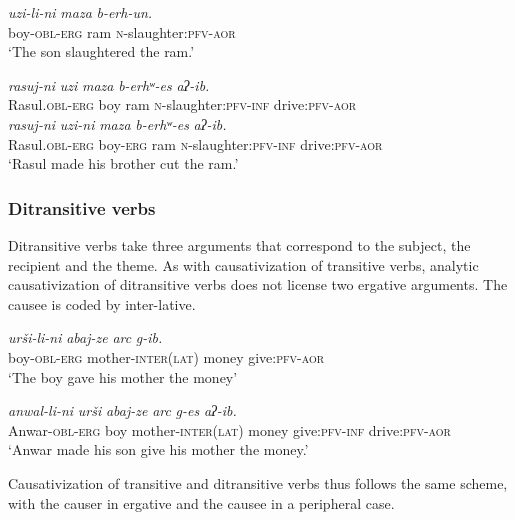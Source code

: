 ﻿\documentclass[output=paper]{langsci/langscibook}
\begin{document}
\ea \label{ex:6:32} %
\ea %
\gll \emph{uzi-li-ni} \emph{maza} \emph{b-erh-un.}\\
boy-\textsc{obl}-\textsc{erg} ram \textsc{n}-slaughter:\textsc{pfv}-\textsc{aor}\\
\glt `The son slaughtered the ram.'

\ex %
\gll \emph{rasuj-ni} \emph{uzi} \emph{maza} \emph{b-erhʷ-es} \emph{aʔ-ib.}\\
Rasul.\textsc{obl}-\textsc{erg} boy ram \textsc{n}-slaughter:\textsc{pfv}-\textsc{inf} drive:\textsc{pfv}-\textsc{aor}\\

\ex %
\gll *\emph{rasuj-ni} \emph{uzi-ni} \emph{maza} \emph{b-erhʷ-es} \emph{aʔ-ib.}\\
Rasul.\textsc{obl}-\textsc{erg} boy-\textsc{erg} ram \textsc{n}-slaughter:\textsc{pfv}-\textsc{inf} drive:\textsc{pfv}-\textsc{aor}\\
\glt `Rasul made his brother cut the ram.'
\z
\z

\removelastskip
{}

\subsubsection{Ditransitive verbs}


Ditransitive verbs take three arguments that correspond to the subject,
the recipient and the theme. As with causativization of transitive
verbs, analytic causativization of ditransitive verbs does not license
two ergative arguments. The causee is coded by inter-lative.

\ea %
\ea %
\gll \emph{urši-li-ni} \emph{abaj-ze} \emph{arc} \emph{g-ib.}\\
boy-\textsc{obl}-\textsc{erg} mother-\textsc{inter}(\textsc{lat}) money give:\textsc{pfv}-\textsc{aor}\\
\glt `The boy gave his mother the money'

\ex %
\gll \emph{anwal-li-ni} \emph{urši} \emph{abaj-ze} \emph{arc} \emph{g-es} \emph{aʔ-ib.}\\
Anwar-\textsc{obl}-\textsc{erg} boy mother-\textsc{inter}(\textsc{lat}) money give:\textsc{pfv}-\textsc{inf} drive:\textsc{pfv}-\textsc{aor}\\
\glt 
`Anwar made his son give his mother the money.'
\z
\z

Causativization of transitive and ditransitive verbs thus follows the
same scheme, with the causer in ergative and the causee in a peripheral
case.
%
\end{document}
